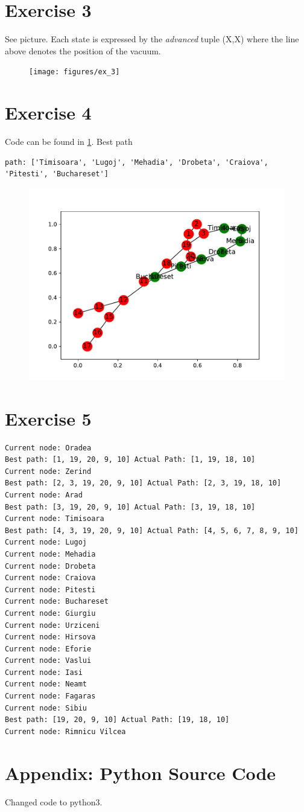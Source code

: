 \documentclass[11pt,a4paper,twoside]{article}
\begin{document}
\FloatBarrier
\section*{Exercise 3}
See picture. Each state is expressed by the \textit{advanced} tuple (X,X) where the line above denotes the position of the vacuum.


\begin{figure}[!hbtp]
	\centering
	\texttt{[image: figures/ex\_3]}
	\label{gauss1}
\end{figure}

\FloatBarrier
\section*{Exercise 4}
Code can be found in \ref{sec:app}.
Best path
\begin{lstlisting}
path: ['Timisoara', 'Lugoj', 'Mehadia', 'Drobeta', 'Craiova', 'Pitesti', 'Buchareset']
\end{lstlisting}

\begin{figure}[!hbtp]
	\centering
	\includegraphics[width=.8\textwidth]{figures/graph}
	\label{gauss1}
\end{figure}

\FloatBarrier
\section*{Exercise 5}
\begin{lstlisting}
Current node: Oradea
Best path: [1, 19, 20, 9, 10] Actual Path: [1, 19, 18, 10]
Current node: Zerind
Best path: [2, 3, 19, 20, 9, 10] Actual Path: [2, 3, 19, 18, 10]
Current node: Arad
Best path: [3, 19, 20, 9, 10] Actual Path: [3, 19, 18, 10]
Current node: Timisoara
Best path: [4, 3, 19, 20, 9, 10] Actual Path: [4, 5, 6, 7, 8, 9, 10]
Current node: Lugoj
Current node: Mehadia
Current node: Drobeta
Current node: Craiova
Current node: Pitesti
Current node: Buchareset
Current node: Giurgiu
Current node: Urziceni
Current node: Hirsova
Current node: Eforie
Current node: Vaslui
Current node: Iasi
Current node: Neamt
Current node: Fagaras
Current node: Sibiu
Best path: [19, 20, 9, 10] Actual Path: [19, 18, 10]
Current node: Rimnicu Vilcea
\end{lstlisting}

\newpage
\section{Appendix: Python Source Code}
\label{sec:app}
Changed code to python3.

\end{document}
